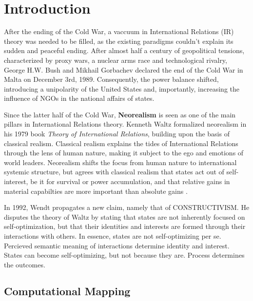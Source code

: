 \section{Introduction}
After the ending of the Cold War, a vaccuum in International Relations (IR) theory was needed to be filled, as the existing paradigms couldn't explain its sudden and peaceful ending. After almost half a century of geopolitical tensions, characterized by proxy wars, a nuclear arms race and technological rivalry, George H.W. Bush and Mikhail Gorbachev declared the end of the Cold War in Malta on December 3rd, 1989. Consequently, the power balance shifted, introducing a unipolarity of the United States and, importantly, increasing the influence of NGOs in the national affairs of states.
 
Since the latter half of the Cold War, \textbf{Neorealism} is seen as one of the main pillars in International Relations theory. Kenneth Waltz formalized neorealism in his 1979 book \textit{Theory of International Relations}, building upon the basis of classical realism. Classical realism explains the tides of International Relations through the lens of human nature, making it subject to the ego and emotions of world leaders. Neorealism shifts the focus from human nature to international systemic structure, but agrees with classical realism that states act out of self-interest, be it for survival or power accumulation, and that relative gains in material capabilties are more important than absolute gains \cite{waltz1979, morgenthau1978}.

In 1992, Wendt \cite{wendt1992} propagates a new claim, namely that of CONSTRUCTIVISM. He disputes the theory of Waltz by stating that states are not inherently focused on self-optimization, but that their identities and interests are formed through their interactions with others. In essence, states are not self-optimizing per se. Percieved semantic meaning of interactions determine identity and interest. States can become self-optimizing, but not because they are. Process determines the outcomes.






\subsection{Computational Mapping}

